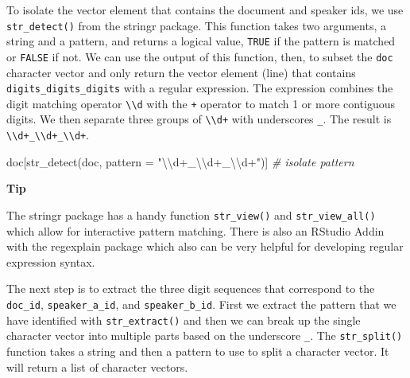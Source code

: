 \documentclass[
  letterpaper,
  DIV=11,
  numbers=noendperiod]{scrreport}
\newenvironment{Shaded}{\begin{snugshade}}{\end{snugshade}}
\newcommand{\AttributeTok}[1]{\textcolor[rgb]{0.00,0.00,0.00}{#1}}
\newcommand{\CommentTok}[1]{\textcolor[rgb]{0.00,0.00,0.00}{\textit{#1}}}
\newcommand{\FunctionTok}[1]{\textcolor[rgb]{0.00,0.00,0.00}{#1}}
\newcommand{\NormalTok}[1]{\textcolor[rgb]{0.00,0.00,0.00}{#1}}
\newcommand{\SpecialCharTok}[1]{\textcolor[rgb]{0.00,0.00,0.00}{#1}}
\newcommand{\StringTok}[1]{\textcolor[rgb]{0.00,0.00,0.00}{#1}}
\theoremstyle{definition}
\theoremstyle{remark}
\begin{document}
To isolate the vector element that contains the document and speaker
ids, we use \texttt{str\_detect()} from the stringr package. This
function takes two arguments, a string and a pattern, and returns a
logical value, \texttt{TRUE} if the pattern is matched or \texttt{FALSE}
if not. We can use the output of this function, then, to subset the
\texttt{doc} character vector and only return the vector element (line)
that contains \texttt{digits\_digits\_digits} with a regular expression.
The expression combines the digit matching operator
\texttt{\textbackslash{}\textbackslash{}d} with the \texttt{+} operator
to match 1 or more contiguous digits. We then separate three groups of
\texttt{\textbackslash{}\textbackslash{}d+} with underscores
\texttt{\_}. The result is
\texttt{\textbackslash{}\textbackslash{}d+\_\textbackslash{}\textbackslash{}d+\_\textbackslash{}\textbackslash{}d+}.

\begin{Shaded}
\begin{Highlighting}[]
\NormalTok{doc[}\FunctionTok{str\_detect}\NormalTok{(doc, }\AttributeTok{pattern =} \StringTok{"}\SpecialCharTok{\textbackslash{}\textbackslash{}}\StringTok{d+\_}\SpecialCharTok{\textbackslash{}\textbackslash{}}\StringTok{d+\_}\SpecialCharTok{\textbackslash{}\textbackslash{}}\StringTok{d+"}\NormalTok{)] }\CommentTok{\# isolate pattern}
\end{Highlighting}
\end{Shaded}

\begin{tcolorbox}[enhanced jigsaw, breakable, arc=.35mm, leftrule=.75mm, rightrule=.15mm, colback=white, toprule=.15mm, bottomrule=.15mm, opacityback=0, left=2mm]

\textbf{ Tip}

The stringr package has a handy function \texttt{str\_view()} and
\texttt{str\_view\_all()} which allow for interactive pattern matching.
There is also an RStudio Addin with the regexplain package which also
can be very helpful for developing regular expression syntax.

\end{tcolorbox}

The next step is to extract the three digit sequences that correspond to
the \texttt{doc\_id}, \texttt{speaker\_a\_id}, and
\texttt{speaker\_b\_id}. First we extract the pattern that we have
identified with \texttt{str\_extract()} and then we can break up the
single character vector into multiple parts based on the underscore
\texttt{\_}. The \texttt{str\_split()} function takes a string and then
a pattern to use to split a character vector. It will return a list of
character vectors.
\end{document}
